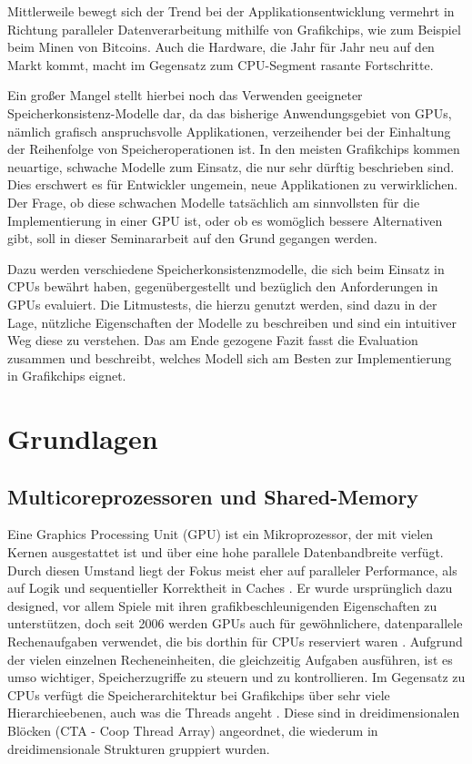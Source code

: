 \documentclass[final,bibliography=totocnumbered]{include/sikseminar}
\begin{document}
Mittlerweile bewegt sich der Trend bei der Applikationsentwicklung vermehrt in Richtung paralleler Datenverarbeitung mithilfe von Grafikchips, wie zum Beispiel beim Minen von Bitcoins.
Auch die Hardware, die Jahr für Jahr neu auf den Markt kommt, macht im Gegensatz zum CPU-Segment rasante Fortschritte. 

 Ein großer Mangel stellt hierbei noch das Verwenden geeigneter Speicherkonsistenz-Modelle dar, da das bisherige Anwendungsgebiet von GPUs, nämlich grafisch anspruchsvolle Applikationen, verzeihender bei der Einhaltung der Reihenfolge von Speicheroperationen ist. In den meisten Grafikchips kommen neuartige,  schwache Modelle zum Einsatz, die nur sehr dürftig beschrieben sind.
Dies erschwert es für Entwickler ungemein, neue Applikationen zu verwirklichen.
Der Frage, ob diese schwachen Modelle tatsächlich am sinnvollsten für die Implementierung in einer GPU ist, oder ob es womöglich bessere Alternativen gibt, soll in dieser Seminararbeit auf den Grund gegangen werden.

Dazu werden verschiedene Speicherkonsistenzmodelle, die sich beim Einsatz in CPUs bewährt haben, gegenübergestellt und bezüglich den Anforderungen in GPUs evaluiert. Die Litmustests, die hierzu genutzt werden, sind dazu in der Lage, nützliche Eigenschaften der  Modelle zu beschreiben und sind ein intuitiver Weg diese zu verstehen.
Das am Ende gezogene Fazit fasst die Evaluation zusammen und beschreibt, welches Modell sich am Besten zur Implementierung in Grafikchips eignet.
 


\newpage
\section{Grundlagen}
\par 
	\subsection{Multicoreprozessoren und Shared-Memory}

Eine Graphics Processing Unit (GPU) ist ein Mikroprozessor, der mit vielen Kernen ausgestattet ist und über eine hohe parallele Datenbandbreite verfügt.
Durch diesen Umstand liegt der Fokus meist eher auf paralleler Performance, als auf Logik und sequentieller Korrektheit in Caches \cite{exploit}.
Er wurde ursprünglich dazu designed, vor allem Spiele mit ihren grafikbeschleunigenden Eigenschaften zu unterstützen, doch seit 2006 werden GPUs auch für gewöhnlichere, datenparallele Rechenaufgaben verwendet, die bis dorthin für CPUs reserviert waren \cite{cudabe}.
Aufgrund der vielen einzelnen Recheneinheiten, die gleichzeitig Aufgaben ausführen, ist es umso wichtiger, Speicherzugriffe zu steuern und zu kontrollieren.
Im Gegensatz zu CPUs verfügt die Speicherarchitektur bei Grafikchips über sehr viele Hierarchieebenen, auch was die Threads angeht  \cite{exploit}.
Diese sind in dreidimensionalen Blöcken (CTA - Coop Thread Array) angeordnet, die wiederum in dreidimensionale Strukturen gruppiert wurden.
\end{document}
